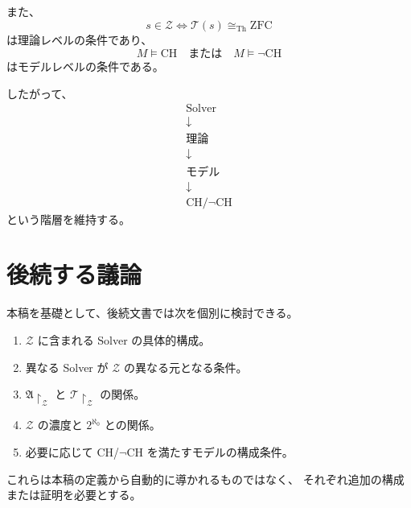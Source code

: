 \documentclass[a4paper,11pt]{jsarticle}
\begin{document}
また、
\[
s\in\mathcal{Z}
\iff
\mathcal{T}(s)\cong_{\mathrm{Th}}\mathrm{ZFC}
\]
は理論レベルの条件であり、
\[
M\models\mathrm{CH}
\quad\text{または}\quad
M\models\neg\mathrm{CH}
\]
はモデルレベルの条件である。

したがって、
\[
\boxed{
\begin{array}{c}
\text{Solver}\\
\downarrow\\
\text{理論}\\
\downarrow\\
\text{モデル}\\
\downarrow\\
\mathrm{CH}/\neg\mathrm{CH}
\end{array}}
\]
という階層を維持する。

\section{後続する議論}

本稿を基礎として、後続文書では次を個別に検討できる。

\begin{enumerate}
\item $\mathcal{Z}$ に含まれる Solver の具体的構成。
\item 異なる Solver が $\mathcal{Z}$ の異なる元となる条件。
\item $\mathfrak{A}\restriction_{\mathcal{Z}}$ と
$\mathcal{T}\restriction_{\mathcal{Z}}$ の関係。
\item $\mathcal{Z}$ の濃度と $2^{\aleph_0}$ との関係。
\item 必要に応じて CH/$\neg$CH を満たすモデルの構成条件。
\end{enumerate}

これらは本稿の定義から自動的に導かれるものではなく、
それぞれ追加の構成または証明を必要とする。
\end{document}
